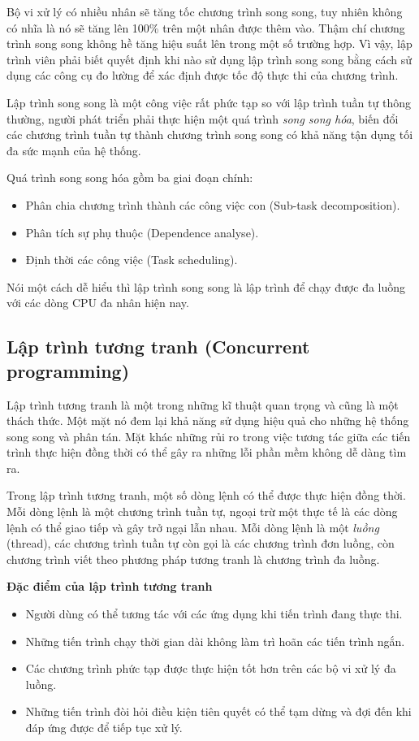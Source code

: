 \documentclass[10pt, a4paper]{article}
\begin{document}
Bộ vi xử lý có nhiều nhân sẽ tăng tốc chương trình song song, tuy nhiên không có nhĩa là nó sẽ tăng lên 100\% trên một nhân được thêm vào. Thậm chí chương trình song song không hề tăng hiệu suất lên trong một số trường hợp. Vì vậy, lập trình viên phải biết quyết định khi nào sử dụng lập trình song song bằng cách sử dụng các công cụ đo lường để xác định được tốc độ thực thi của chương trình.

Lập trình song song là một công việc rất phức tạp so với lập trình tuần tự thông thường, người phát triển phải thực hiện một quá trình \emph{song song hóa}, biến đổi các chương trình tuần tự thành chương trình song song có khả năng tận dụng tối đa sức mạnh của hệ thống.

Quá trình song song hóa gồm ba giai đoạn chính:
\begin{itemize}
\item Phân chia chương trình thành các công việc con (Sub-task decomposition).
\item Phân tích sự phụ thuộc (Dependence analyse).
\item Định thời các công việc (Task scheduling).
\end{itemize}
Nói một cách dễ hiểu thì lập trình song song là lập trình để chạy được đa luồng với các dòng CPU đa nhân hiện nay.

\subsection{Lập trình tương tranh (Concurrent programming)}
Lập trình tương tranh là một trong những kĩ thuật quan trọng và cũng là một thách thức. Một mặt nó đem lại khả năng sử dụng hiệu quả cho những hệ thống song song và phân tán. Mặt khác những rủi ro trong việc tương tác giữa các tiến trình thực hiện đồng thời có thể gây ra những lỗi phần mềm không dễ dàng tìm ra.

Trong lập trình tương tranh, một số dòng lệnh có thể được thực hiện đồng thời. Mỗi dòng lệnh là một chương trình  tuần tự, ngoại trừ một thực tế là các dòng lệnh có thể giao tiếp và gây trở ngại lẫn nhau. Mỗi dòng lệnh là một \emph{luồng} (thread), các chương trình tuần tự còn gọi là các chương trình đơn luồng, còn chương trình viết theo phương pháp tương tranh là chương trình đa luồng.

\textbf{Đặc điểm của lập trình tương tranh}
\begin{itemize}
\item Người dùng có thể tương tác với các ứng dụng khi tiến trình đang thực thi.
\item Những tiến trình chạy thời gian dài không làm trì hoãn các tiến trình ngắn.
\item Các chương trình phức tạp được thực hiện tốt hơn trên các bộ vi xử lý đa luồng.
\item Những tiến trình đòi hỏi điều kiện tiên quyết có thể tạm dừng và đợi đến khi đáp ứng được để tiếp tục xử lý.
\end{itemize}
\end{document}
